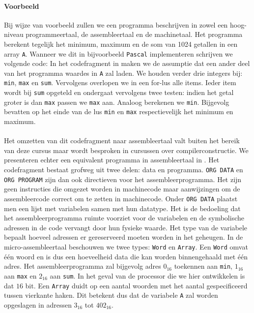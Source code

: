 \paragraph{Voorbeeld}
Bij wijze van voorbeeld zullen we een programma beschrijven in zowel een hoog-niveau programmeertaal, de assembleertaal en de machinetaal. Het programma berekent tegelijk het minimum, maximum en de som van 1024 getallen in een array \verb+A+. Wanneer we dit in bijvoorbeeld \verb+Pascal+ implementeren schrijven we volgende code:
In het codefragment in  maken we de assumptie dat een ander deel van het programma waardes in \verb+A+ zal laden. We houden verder drie integers bij: \verb+min+, \verb+max+ en \verb+sum+. Vervolgens overlopen we in een for-lus alle items. Ieder item wordt bij \verb+sum+ opgeteld en ondergaat vervolgens twee testen: indien het getal groter is dan \verb+max+ passen we \verb+max+ aan. Analoog berekenen we \verb+min+. Bijgevolg bevatten op het einde van de lus \verb+min+ en \verb+max+ respectievelijk het minimum en maximum.
\paragraph{}
Het omzetten van dit codefragment naar assembleertaal valt buiten het bereik van deze cursus maar wordt besproken in cursussen over compilerconstructie. We presenteren echter een equivalent programma in assembleertaal in .
Het codefragment bestaat grofweg uit twee delen: data en programma. \verb+ORG DATA+ en \verb+ORG PROGRAM+ zijn dan ook directieven voor het assembleerprogramma. Het zijn geen instructies die omgezet worden in machinecode maar aanwijzingen om de assembleercode correct om te zetten in machinecode. Onder \verb+ORG DATA+ plaatst men een lijst met variabelen samen met hun datatype. Het is de bedoeling dat het assembleerprogramma ruimte voorziet voor de variabelen en de symbolische adressen in de code vervangt door hun fysieke waarde. Het type van de variabele bepaalt hoeveel adressen er gereserveerd moeten worden in het geheugen. In de micro-assembleertaal beschouwen we twee types: \verb+Word+ en \verb+Array+. Een \verb+Word+ omvat \'e\'en woord en is dus een hoeveelheid data die kan worden binnengehaald met \'e\'en adres. Het assembleerprogramma zal bijgevolg adres $0_{16}$ toekennen aan \verb+min+, $1_{16}$ aan \verb+max+ en $2_{16}$ aan \verb+sum+. In het geval van de processor die we hier ontwikkelen is dat $16$ bit. Een \verb+Array+ duidt op een aantal woorden met het aantal gespecificeerd tussen vierkante haken. Dit betekent dus dat de variabele \verb+A+ zal worden opgeslagen in adressen $3_{16}$ tot $402_{16}$.
